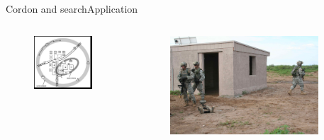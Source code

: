 \begin{frame}{Cordon and search}{Application}
\begin{columns}
	\begin{minipage}{\textwidth}
		\begin{figure}
			\centering
			\includegraphics[width = 0.9\textwidth]{./figure/cordon_and_search.jpg}
		\end{figure}
	\end{minipage}
	
	\begin{minipage}{\textwidth}
		\begin{figure}
			\centering
			\includegraphics[width = 0.9\textwidth]{./figure/soldier_and_robot.jpg}
		\end{figure}
	\end{minipage}	
\end{columns}
\end{frame}

